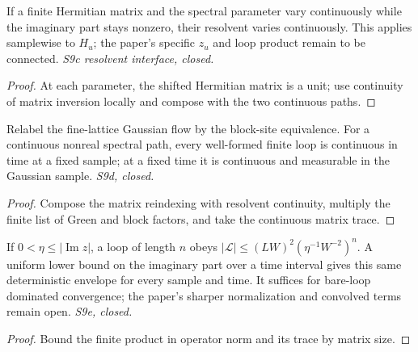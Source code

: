 \begin{lemma}
  \label{lem:green-time-cont}
  \leanok
  If a finite Hermitian matrix and the spectral parameter vary continuously
  while the imaginary part stays nonzero, their resolvent varies continuously.
  This applies samplewise to $H_u$; the paper's specific $z_u$ and loop product
  remain to be connected. \emph{S9c resolvent interface, closed.}
\end{lemma}
\begin{proof}\leanok
  At each parameter, the shifted Hermitian matrix is a unit; use continuity of
  matrix inversion locally and compose with the two continuous paths.
\end{proof}

\begin{lemma}
  \label{lem:loop-time-cont}
  \leanok
  Relabel the fine-lattice Gaussian flow by the block-site equivalence.
  For a continuous nonreal spectral path, every well-formed finite loop is
  continuous in time at a fixed sample; at a fixed time it is continuous and
  measurable in the Gaussian sample. \emph{S9d, closed.}
\end{lemma}
\begin{proof}\leanok
  Compose the matrix reindexing with resolvent continuity, multiply the finite
  list of Green and block factors, and take the continuous matrix trace.
\end{proof}

\begin{lemma}
  \label{lem:loop-envelope}
  \leanok
  If $0<\eta\le|\operatorname{Im}z|$, a loop of length $n$ obeys
  $|\mathcal L|\le(LW)^2(\eta^{-1}W^{-2})^n$. A uniform lower bound on the
  imaginary part over a time interval gives this same deterministic envelope
  for every sample and time. It suffices for bare-loop dominated convergence;
  the paper's sharper normalization and convolved terms remain open.
  \emph{S9e, closed.}
\end{lemma}
\begin{proof}\leanok
  Bound the finite product in operator norm and its trace by matrix size.
\end{proof}

